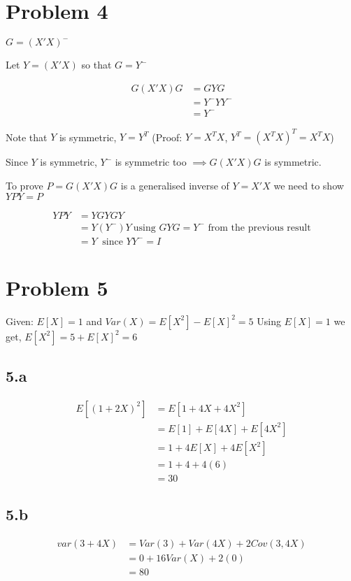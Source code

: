 \documentclass[a4paper]{article}
\begin{document}
\section*{Problem 4}
$G=(X'X)^-$

Let $Y=(X'X)$ so that $G=Y^-$

\begin{align*}
G(X'X)G &= GYG\\
&= Y^-YY^-\\
&= Y^-
\end{align*}

Note that $Y$ is symmetric, $Y=Y^T$
(Proof: $Y=X^TX$, $Y^T=(X^TX)^T = X^TX$)

Since $Y$ is symmetric, $Y^-$ is symmetric too $\implies G(X'X)G$ is symmetric.

To prove $P=G(X'X)G$ is a generalised inverse of $Y=X'X$ we need to show $YPY=P$

\begin{align*}
YPY &= YGYGY\\
&= Y(Y^-)Y\ \text{using $GYG=Y^-$ from the previous result} \\
&= Y \ \text{ since } YY^-=I
\end{align*}

\section*{Problem 5}

Given: $E[X]=1$ and $Var(X)=E[X^2]-E[X]^2 = 5$
Using $E[X]=1$ we get, $E[X^2]=5+E[X]^2=6$

\subsection*{5.a}

\begin{align*}
E[(1+2X)^2] &= E[1+4X+4X^2]\\
&= E[1]+E[4X]+E[4X^2]\\
&= 1+4E[X]+4E[X^2]\\
&= 1+4+4(6)\\
&= 30
\end{align*}

\subsection*{5.b}
\begin{align*}
var(3+4X) &= Var(3) + Var(4X) + 2Cov(3,4X)\\
&= 0 + 16Var(X) + 2(0)\\
&= 80
\end{align*}
\end{document}
